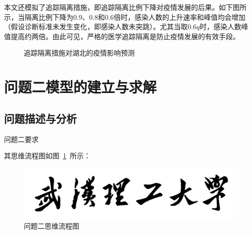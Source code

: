 \documentclass{whutmod}
\begin{document}
       本文还模拟了追踪隔离措施，即追踪隔离比例下降对疫情发展的后果。如下图所示，当隔离比例下降为0.9、0.8和0.6倍时，感染人数的上升速率和峰值均会增加（假设诊断标准未发生变化，即感染人数未突跳）。尤其当取$0.6q$时，感染人数峰值提高约两倍。由此可见，严格的医学追踪隔离是防止疫情发展的有效手段。
          \begin{figure}[H]
        	\centering
        	\caption{追踪隔离措施对湖北的疫情影响预测}
        \end{figure}
        
  
	\section{问题二模型的建立与求解}
		\subsection{问题描述与分析}
			问题二要求

    		其思维流程图如图~\ref{lssssct}~所示：

			\begin{figure}[H]
				\centering
				\includegraphics[width=\textwidth]{figures/whut.jpg}
				\caption{问题二思维流程图}\label{lssssct}
			\end{figure}
\end{document}
